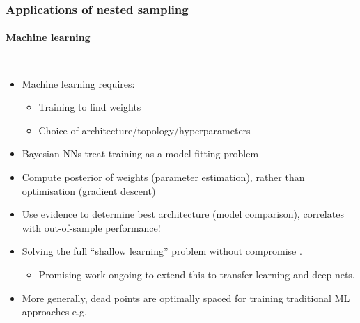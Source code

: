 \documentclass[aspectratio=169]{beamer}
\begin{document}
\begin{frame}
    \frametitle{Applications of nested sampling}
    \framesubtitle{Machine learning}
    \begin{columns}
        \begin{itemize}
            \item Machine learning requires:
                \begin{itemize}
                    \item Training to find weights
                    \item Choice of architecture/topology/hyperparameters
                \end{itemize}
            \item Bayesian NNs treat training as a model fitting problem
            \item Compute posterior of weights (parameter estimation), rather than optimisation (gradient descent)
            \item Use evidence to determine best architecture (model comparison), correlates with out-of-sample performance! 
            \item Solving the full ``shallow learning'' problem without compromise . 
                \begin{itemize}
                    \item Promising work ongoing to extend this to transfer learning and deep nets.
                \end{itemize}
            \item More generally, dead points are optimally spaced  for training traditional ML approaches e.g. 
        \end{itemize}

\end{columns}
\end{frame}
\end{document}
